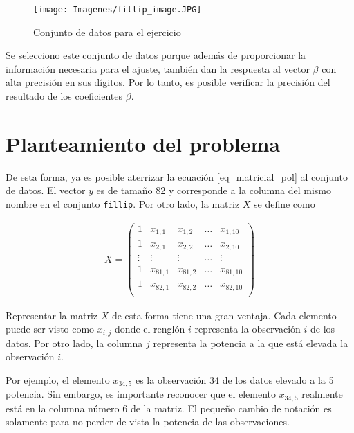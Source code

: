\begin{figure}[h]
	\begin{center}
		\texttt{[image: Imagenes/fillip\_image.JPG]}
		\label{fillip_graph}
		\caption{Conjunto de datos para el ejercicio}
	\end{center}
\end{figure}

Se selecciono este conjunto de datos porque además de proporcionar la información necesaria para el ajuste, también dan la respuesta al vector $\beta$ con alta precisión en sus dígitos. Por lo tanto, es posible verificar la precisión del resultado de los coeficientes $\beta$. 

\section{Planteamiento del problema}

De esta forma, ya es posible aterrizar la ecuación \ref{eq_matricial_pol} al conjunto de datos. El vector $y$ es de tamaño 82 y corresponde a la columna del mismo nombre en el conjunto \texttt{fillip}. Por otro lado, la matriz $X$ se define como 

\begin{equation*}
    \begin{aligned}
    X = 
    \begin{pmatrix}
    1 & x_{1,1} & x_{1,2} & \dots & x_{1, 10}  \\
    1 & x_{2,1} & x_{2, 2} & \dots & x_{2, 10} \\
    \vdots & \vdots & \vdots & \dots & \vdots \\
    1 & x_{81,1} & x_{81, 2} & \dots & x_{81, 10} \\
    1 & x_{82,1} & x_{82, 2} & \dots & x_{82, 10} \\
    \end{pmatrix}
    \end{aligned}
\end{equation*} 

Representar la matriz $X$ de esta forma tiene una gran ventaja. Cada elemento puede ser visto como $x_{i, j}$ donde el renglón $i$ representa la observación $i$ de los datos. Por otro lado, la columna $j$ representa la potencia a la que está elevada la observación $i$. 

Por ejemplo, el elemento $x_{34, 5}$ es la observación 34 de los datos elevado a la 5 potencia. Sin embargo, es importante reconocer que el elemento $x_{34, 5}$ realmente está en la columna número 6 de la matriz. El pequeño cambio de notación es solamente para no perder de vista la potencia de las observaciones. 

